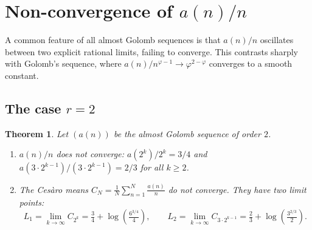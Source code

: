\documentclass[12pt]{article}
\newtheorem{theorem}{Theorem}[section]
\theoremstyle{definition}
\theoremstyle{remark}
\begin{document}
\section{Non-convergence of $a(n)/n$}\label{sec:nonconv}

A common feature of all almost Golomb sequences is that $a(n)/n$ oscillates
between two explicit rational limits, failing to converge. This contrasts
sharply with Golomb's sequence, where $a(n)/n^{\varphi-1}\to\varphi^{2-\varphi}$
converges to a smooth constant.

\subsection{The case $r=2$}

\begin{theorem}\label{thm:ratio2}
  Let $(a(n))$ be the almost Golomb sequence of order $2$.
  \begin{enumerate}[label=(\roman*)]
    \item $a(n)/n$ does not converge: $a(2^k)/2^k = 3/4$ and
          $a(3\cdot 2^{k-1})/(3\cdot 2^{k-1}) = 2/3$ for all $k\ge 2$.
    \item The Cesàro means $C_N = \frac{1}{N}\sum_{n=1}^N \frac{a(n)}{n}$
          do not converge. They have two limit points:
          \[
            L_1 = \lim_{k\to\infty} C_{2^k}
                = \tfrac{3}{4} + \log\!\left(\tfrac{6^{3/4}}{4}\right),
            \qquad
            L_2 = \lim_{k\to\infty} C_{3\cdot 2^{k-1}}
                = \tfrac{2}{3} + \log\!\left(\tfrac{3^{2/3}}{2}\right).
          \]
  \end{enumerate}
\end{theorem}
\end{document}
